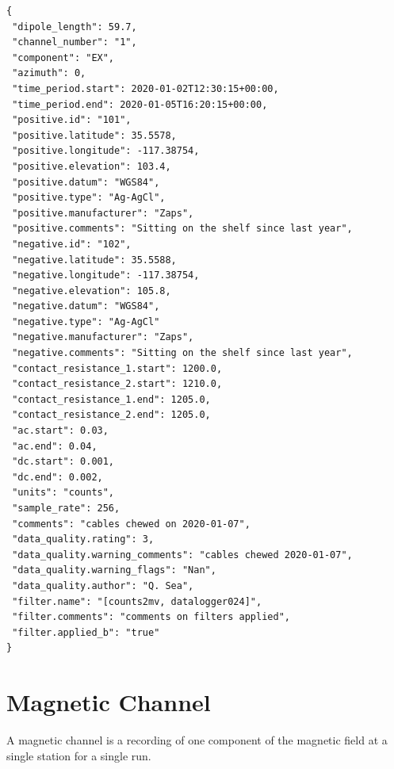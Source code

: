 \documentclass{article}
\begin{document}
\begin{verbatim}
{
 "dipole_length": 59.7,
 "channel_number": "1",
 "component": "EX",
 "azimuth": 0,
 "time_period.start": 2020-01-02T12:30:15+00:00,
 "time_period.end": 2020-01-05T16:20:15+00:00,
 "positive.id": "101",
 "positive.latitude": 35.5578,
 "positive.longitude": -117.38754,
 "positive.elevation": 103.4,
 "positive.datum": "WGS84",
 "positive.type": "Ag-AgCl",
 "positive.manufacturer": "Zaps",
 "positive.comments": "Sitting on the shelf since last year",
 "negative.id": "102",
 "negative.latitude": 35.5588,
 "negative.longitude": -117.38754,
 "negative.elevation": 105.8,
 "negative.datum": "WGS84",
 "negative.type": "Ag-AgCl"
 "negative.manufacturer": "Zaps",
 "negative.comments": "Sitting on the shelf since last year",
 "contact_resistance_1.start": 1200.0,
 "contact_resistance_2.start": 1210.0,
 "contact_resistance_1.end": 1205.0,
 "contact_resistance_2.end": 1205.0,
 "ac.start": 0.03,
 "ac.end": 0.04,
 "dc.start": 0.001,
 "dc.end": 0.002,
 "units": "counts",
 "sample_rate": 256,
 "comments": "cables chewed on 2020-01-07",
 "data_quality.rating": 3,
 "data_quality.warning_comments": "cables chewed 2020-01-07",
 "data_quality.warning_flags": "Nan",
 "data_quality.author": "Q. Sea",
 "filter.name": "[counts2mv, datalogger024]",
 "filter.comments": "comments on filters applied",
 "filter.applied_b": "true"
}
\end{verbatim}

\newpage
\section{Magnetic Channel}

A magnetic channel is a recording of one component of the magnetic field at a single station for a single run.
\end{document}
